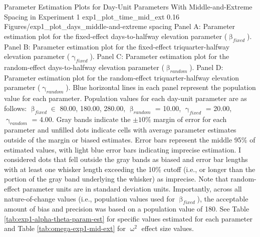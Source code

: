 \documentclass[
12pt, %
twoside,
english]{guelphthesis}
\theoremstyle{definition}
\theoremstyle{definition}
\theoremstyle{definition}
\theoremstyle{definition}
\theoremstyle{remark}
\begin{document}
\begin{apaFigure}
[portrait]
[samepage]
[-0.2cm]
{Parameter Estimation Plots for Day-Unit Parameters With Middle-and-Extreme Spacing in Experiment 1}
{exp1_plot_time_mid_ext}
{0.16}
{Figures/exp1_plot_days_middle-and-extreme spacing}
{Panel A: Parameter estimation plot for the fixed-effect days-to-halfway elevation parameter ($\upbeta_{fixed}$). Panel B: Parameter estimation plot for the fixed-effect triquarter-halfway elevation parameter ($\upgamma_{fixed}$). Panel C: Parameter estimation plot for the random-effect days-to-halfway elevation parameter ($\upbeta_{random}$). Panel D: Parameter estimation plot for the random-effect triquarter-halfway elevation parameter ($\upgamma_{random}$). Blue horizontal lines in each panel represent the population value for each parameter. Population values for each day-unit parameter are as follows: $\upbeta_{fixed} \in$ {80.00, 180.00, 280.00}, $\upbeta_{random}$ = 10.00, $\upgamma_{fixed}$ = 20.00, $\upgamma_{random}$ = 4.00. Gray bands indicate the $\pm 10\%$ margin of error for each parameter and unfilled dots indicate cells with average parameter estimates outside of the margin or biased estimates. Error bars represent the middle 95\% of estimated values, with light blue error bars indicating imprecise estimation. I considered dots that fell outside the gray bands as biased and error bar lengths with at least one whisker length exceeding the 10\% cutoff (i.e., or longer than the portion of the gray band underlying the whisker) as imprecise. Note that random-effect parameter units are in standard deviation units. Importantly, across all nature-of-change values (i.e., population values used for $\upbeta_{fixed}$), the acceptable amount of bias and precision was based on a population value of 180. See Table \ref{tab:exp1-alpha-theta-param-est} for specific values estimated for each parameter and Table \ref{tab:omega-exp1-mid-ext} for $\upomega^2$ effect size values.}
\end{apaFigure}
\end{document}
